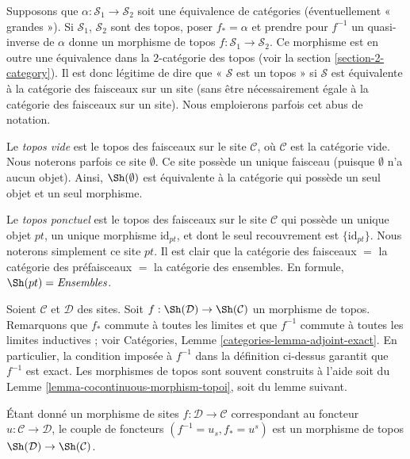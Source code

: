 \noindent
Supposons que $\alpha : \mathcal{S}_1 \to \mathcal{S}_2$ soit une équivalence de
catégories (éventuellement « grandes »). Si $\mathcal{S}_1$, $\mathcal{S}_2$
sont des topos, poser $f_* = \alpha$ et prendre pour $f^{-1}$ un quasi-inverse
de $\alpha$ donne un morphisme de topos $f : \mathcal{S}_1 \to \mathcal{S}_2$.
Ce morphisme est en outre une équivalence dans la $2$-catégorie des topos (voir
la section \ref{section-2-category}).
Il est donc légitime de dire que « $\mathcal{S}$ est un topos » si $\mathcal{S}$
est équivalente à la catégorie des faisceaux sur un site (sans être nécessairement
égale à la catégorie des faisceaux sur un site). Nous emploierons parfois
cet abus de notation.

\medskip\noindent
Le {\it topos vide} est le topos
des faisceaux sur le site $\mathcal{C}$, où $\mathcal{C}$
est la catégorie vide. Nous noterons parfois ce site $\emptyset$.
Ce site possède un unique faisceau (puisque $\emptyset$ n’a aucun
objet). Ainsi, $\Sh(\emptyset)$ est équivalente à la catégorie
qui possède un seul objet et un seul morphisme.

\medskip\noindent
Le {\it topos ponctuel} est le topos des faisceaux sur le site
$\mathcal{C}$ qui possède un unique objet $pt$, un unique morphisme
$\text{id}_{pt}$, et dont le seul recouvrement est
$\{\text{id}_{pt}\}$. Nous noterons simplement ce site $pt$.
Il est clair que la catégorie des faisceaux $ = $ la catégorie des
préfaisceaux $ = $ la catégorie des ensembles.
En formule, $\Sh(pt) = \textit{Ensembles}$.

\medskip\noindent
Soient $\mathcal{C}$ et $\mathcal{D}$ des sites. Soit
$f : \Sh(\mathcal{D}) \to \Sh(\mathcal{C})$ un morphisme de topos.
Remarquons que $f_*$ commute à toutes les limites et que
$f^{-1}$ commute à toutes les limites inductives ; voir Catégories,
Lemme \ref{categories-lemma-adjoint-exact}.
En particulier, la condition imposée à $f^{-1}$ dans la définition ci-dessus
garantit que $f^{-1}$ est exact. Les morphismes de topos sont souvent construits
à l’aide soit du Lemme \ref{lemma-cocontinuous-morphism-topoi},
soit du lemme suivant.

\begin{lemma}
\label{lemma-morphism-sites-topoi}
Étant donné un morphisme de sites $f : \mathcal{D} \to \mathcal{C}$
correspondant au foncteur $u : \mathcal{C} \to \mathcal{D}$,
le couple de foncteurs $(f^{-1} = u_s, f_* = u^s)$ est un morphisme de topos
$\Sh(\mathcal{D}) \to \Sh(\mathcal{C})$.
\end{lemma}

